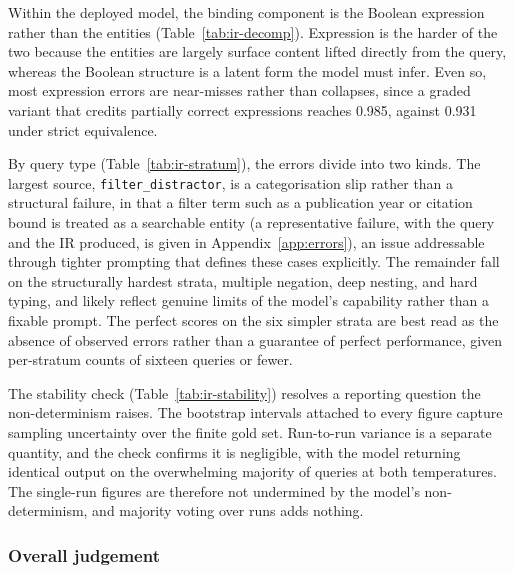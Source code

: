Within the deployed model, the binding component is the Boolean expression rather than the entities (Table~\ref{tab:ir-decomp}). Expression is the harder of the two because the entities are largely surface content lifted directly from the query, whereas the Boolean structure is a latent form the model must infer. Even so, most expression errors are near-misses rather than collapses, since a graded variant that credits partially correct expressions reaches 0.985, against 0.931 under strict equivalence.

By query type (Table~\ref{tab:ir-stratum}), the errors divide into two kinds. The largest source, \texttt{filter\_distractor}, is a categorisation slip rather than a structural failure, in that a filter term such as a publication year or citation bound is treated as a searchable entity (a representative failure, with the query and the IR produced, is given in Appendix~\ref{app:errors}), an issue addressable through tighter prompting that defines these cases explicitly.
The remainder fall on the structurally hardest strata, multiple negation, deep nesting, and hard typing, and likely reflect genuine limits of the model's capability rather than a fixable prompt. The perfect scores on the six simpler strata are best read as the absence of observed errors rather than a guarantee of perfect performance, given per-stratum counts of sixteen queries or fewer.

The stability check (Table~\ref{tab:ir-stability}) resolves a reporting question the non-determinism raises. The bootstrap intervals attached to every figure capture sampling uncertainty over the finite gold set. Run-to-run variance is a separate quantity, and the check confirms it is negligible, with the model returning identical output on the overwhelming majority of queries at both temperatures. The single-run figures are therefore not undermined by the model's non-determinism, and majority voting over runs adds nothing.

\subsubsection{Overall judgement}

